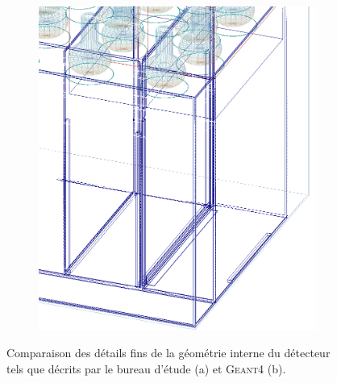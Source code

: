 {\begin{figure}[h!]
\begin{subfigure}[b]{0.49\textwidth}
\centering
\includegraphics[height=0.3\paperheight]{images/geom_g4.png}
\label{fig:geom_G4}

\end{subfigure}
\caption{Comparaison des détails fins de la géométrie interne du détecteur tels que décrits par le bureau d'étude (a) et \textsc{Geant4} (b).}
\label{fig:geom_comparison}
\end{figure}


}

